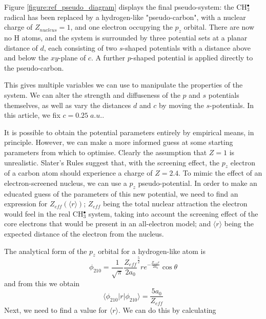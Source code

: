 \documentclass[aip]{revtex4-1}
\begin{document}
Figure \ref{figure:ref_pseudo_diagram} displays the final pseudo-system: the CH\(^{\bullet}_{3}\) radical has been replaced by
a hydrogen-like "pseudo-carbon", with a nuclear charge of \(Z_{nucleus} = 1\), and one electron occupying the \(p_{z}\) orbital. 
There are now no H atoms, and the system is surrounded by three potential sets at a planar distance of \(d\), each consisting of 
two \(s\)-shaped potentials with a distance above and below the \(xy\)-plane of \(c\). A further \(p\)-shaped potential is applied
directly to the pseudo-carbon.

This gives multiple variables we can use to manipulate the properties of the system.
We can alter the strength and diffuseness of the \(p\) and \(s\) potentials themselves,
as well as vary the distances \(d\) and \(c\) by moving the \(s\)-potentials.
In this article, we fix \(c = 0.25\;a.u.\).


It is possible to obtain the potential parameters entirely by empirical means, in principle. However, we can make a more informed guess at some starting parameters from which to optimise. Clearly the assumption that \(Z = 1\) is unrealistic. Slater's Rules\cite{slatersrules} suggest that, with the screening effect, the \(p_{z}\) electron of a carbon atom should experience a charge of \(Z = 2.4\). To mimic the effect of an electron-screened nucleus, we can use a \(p_{z}\) pseudo-potential. In order to make an educated guess of the parameters of this new potential, we need to find an expression for \(Z_{eff}(\langle r \rangle)\); \(Z_{eff}\) being the total nuclear attraction the electron would feel in the real CH\(^{\bullet}_{3}\) system, taking into account the screening effect of the core electrons that would be present in an all-electron model; and \( \langle r \rangle \) being the expected distance of the electron from the nucleus.

The analytical form of the \(p_{z}\) orbital for a hydrogen-like atom is\cite{nyu_h_solutions}
\begin{equation}
\phi_{210} = \frac{1}{\sqrt{\pi}} \frac{Z_{eff}}{2a_{0}} ^{\frac{5}{2}} re^{-\frac{Z_{eff}r}{2a_{0}}} \cos \theta
\end{equation}
and from this we obtain 
\begin{equation}
\label{equation:PsirPsi}
\langle \phi_{210} | r | \phi_{210} \rangle = \frac{5a_{0}}{Z_{eff}}
\end{equation}
Next, we need to find a value for \( \langle r \rangle \). We can do this by calculating
\end{document}
